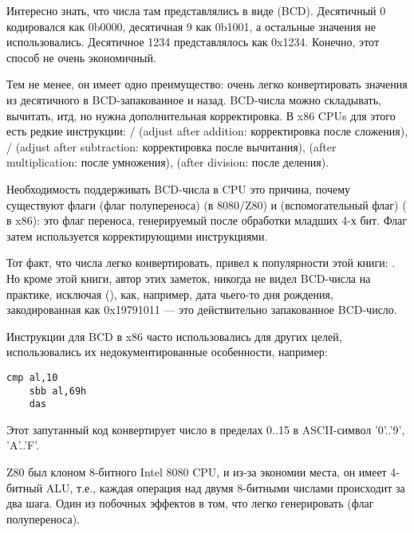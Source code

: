 Интересно знать, что числа там представлялись в виде  (\ac{BCD}).
Десятичный 0 кодировался как 0b0000, десятичная 9 как 0b1001, а остальные значения не использовались.
Десятичное 1234 представлялось как 0x1234.
Конечно, этот способ не очень экономичный.

Тем не менее, он имеет одно преимущество: очень легко конвертировать значения из десятичного в \ac{BCD}-запакованное и назад.
BCD-числа можно складывать, вычитать, итд, но нужна дополнительная корректировка.
В x86 CPUs для этого есть редкие инструкции:
/ (adjust after addition: корректировка после сложения),
/ (adjust after subtraction: корректировка после вычитания),
 (after multiplication: после умножения),
 (after division: после деления).

Необходимость поддерживать \ac{BCD}-числа в CPU это причина, почему существуют флаги  (флаг полупереноса)
(в 8080/Z80) и
 (вспомогательный флаг) ( в x86):
это флаг переноса, генерируемый после обработки младших 4-х бит. Флаг затем используется корректирующими инструкциями.

Тот факт, что числа легко конвертировать, привел к популярности этой книги:
.
Но кроме этой книги, автор этих заметок, никогда не видел \ac{BCD}-числа на практике, исключая
 (),
как, например, дата чьего-то дня рождения, закодированная как 0x19791011 --- это действительно запакованное
\ac{BCD}-число.

Инструкции для \ac{BCD} в x86 часто использовались для других целей, использовались их недокументированные особенности,
например:

\begin{lstlisting}[style=customasmx86]
	cmp al,10
	sbb al,69h
	das
\end{lstlisting}

Этот запутанный код конвертирует число в пределах 0..15 в \ac{ASCII}-символ '0'..'9', 'A'..'F'.


Z80 был клоном 8-битного Intel 8080 CPU, и из-за экономии места, он имеет 4-битный \ac{ALU}, т.е., каждая
операция над двумя 8-битными числами происходит за два шага.
Один из побочных эффектов в том, что легко генерировать  (флаг полупереноса).


